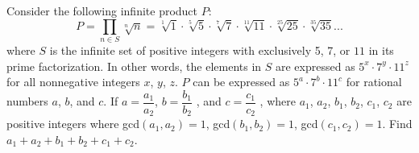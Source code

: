 Consider the following infinite product $P$: \[P =\prod_{n \in S}\sqrt[n]{n} = \sqrt[1]{1} \cdot \sqrt[5]{5}\cdot \sqrt[7]{7}\cdot \sqrt[11]{11}\cdot \sqrt[25]{25}\cdot \sqrt[35]{35} ...\]where $S$ is the infinite set of positive integers with exclusively 5, 7, or $11$ in its prime factorization. In other words, the elements in $S$ are expressed as $5^x  \cdot  7^y \cdot 11^z$ for all nonnegative integers $x$, $y$, $z$. $P$ can be expressed as $5^a  \cdot  7^b  \cdot  11^c$ for rational numbers $a$, $b$, and $c$. If $a = \dfrac{a_1}{a_2}$, $b = \dfrac{b_1}{b_2}$ , and $c = \dfrac{c_1}{c_2}$ , where $a_1$, $a_2$, $b_1$, $b_2$, $c_1$, $c_2$ are positive integers where gcd$(a_1, a_2) = 1$, gcd$(b_1, b_2) = 1$, gcd$(c_1, c_2) = 1$. Find $a_1 + a_2 + b_1 + b_2 + c_1 + c_2$.
